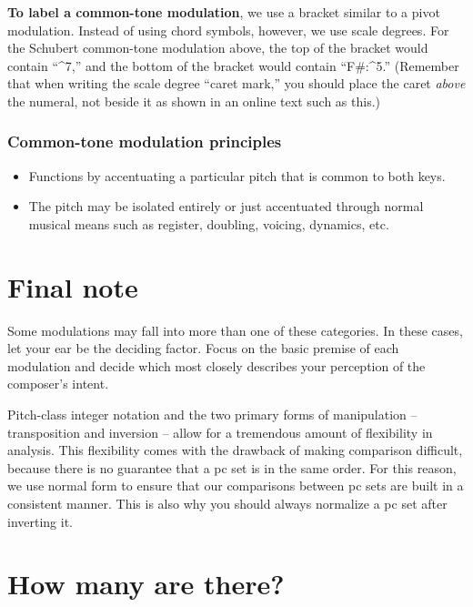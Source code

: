 \documentclass{book}
\providecommand{\tightlist}{%
  \setlength{\itemsep}{0pt}\setlength{\parskip}{0pt}}
\begin{document}
\textbf{To label a common-tone modulation}, we use a bracket similar to a
pivot modulation. Instead of using chord symbols, however, we use scale
degrees. For the Schubert common-tone modulation above, the top of the bracket
would contain ``\^{}7,'' and the bottom of the bracket would contain
``F\#:\^{}5.'' (Remember that when writing the scale degree ``caret mark,''
you should place the caret \emph{above} the numeral, not beside it as shown in
an online text such as this.)

\hypertarget{common-tone-modulation-principles}{%
\subsubsection{Common-tone modulation
principles}\label{common-tone-modulation-principles}}

\begin{itemize}
\tightlist
\item
  Functions by accentuating a particular pitch that is common to both keys.
\item
  The pitch may be isolated entirely or just accentuated through normal
  musical means such as register, doubling, voicing, dynamics, etc.
\end{itemize}

\hypertarget{final-note}{%
\section{Final note}\label{final-note}}

Some modulations may fall into more than one of these categories. In these
cases, let your ear be the deciding factor. Focus on the basic premise of each
modulation and decide which most closely describes your perception of the
composer's intent.

Pitch-class integer notation and the two primary forms of manipulation --
transposition and inversion -- allow for a tremendous amount of flexibility in
analysis. This flexibility comes with the drawback of making comparison
difficult, because there is no guarantee that a pc set is in the same order.
For this reason, we use normal form to ensure that our comparisons between pc
sets are built in a consistent manner. This is also why you should always
normalize a pc set after inverting it.

\hypertarget{how-many-are-there}{%
\section{How many are there?}\label{how-many-are-there}}
\end{document}
